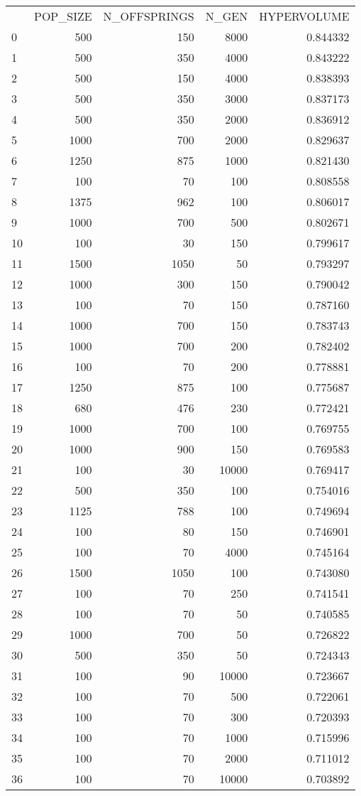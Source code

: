 \begin{tabular}{lrrrr}
 & POP_SIZE & N_OFFSPRINGS & N_GEN & HYPERVOLUME \\
0 & 500 & 150 & 8000 & 0.844332 \\
1 & 500 & 350 & 4000 & 0.843222 \\
2 & 500 & 150 & 4000 & 0.838393 \\
3 & 500 & 350 & 3000 & 0.837173 \\
4 & 500 & 350 & 2000 & 0.836912 \\
5 & 1000 & 700 & 2000 & 0.829637 \\
6 & 1250 & 875 & 1000 & 0.821430 \\
7 & 100 & 70 & 100 & 0.808558 \\
8 & 1375 & 962 & 100 & 0.806017 \\
9 & 1000 & 700 & 500 & 0.802671 \\
10 & 100 & 30 & 150 & 0.799617 \\
11 & 1500 & 1050 & 50 & 0.793297 \\
12 & 1000 & 300 & 150 & 0.790042 \\
13 & 100 & 70 & 150 & 0.787160 \\
14 & 1000 & 700 & 150 & 0.783743 \\
15 & 1000 & 700 & 200 & 0.782402 \\
16 & 100 & 70 & 200 & 0.778881 \\
17 & 1250 & 875 & 100 & 0.775687 \\
18 & 680 & 476 & 230 & 0.772421 \\
19 & 1000 & 700 & 100 & 0.769755 \\
20 & 1000 & 900 & 150 & 0.769583 \\
21 & 100 & 30 & 10000 & 0.769417 \\
22 & 500 & 350 & 100 & 0.754016 \\
23 & 1125 & 788 & 100 & 0.749694 \\
24 & 100 & 80 & 150 & 0.746901 \\
25 & 100 & 70 & 4000 & 0.745164 \\
26 & 1500 & 1050 & 100 & 0.743080 \\
27 & 100 & 70 & 250 & 0.741541 \\
28 & 100 & 70 & 50 & 0.740585 \\
29 & 1000 & 700 & 50 & 0.726822 \\
30 & 500 & 350 & 50 & 0.724343 \\
31 & 100 & 90 & 10000 & 0.723667 \\
32 & 100 & 70 & 500 & 0.722061 \\
33 & 100 & 70 & 300 & 0.720393 \\
34 & 100 & 70 & 1000 & 0.715996 \\
35 & 100 & 70 & 2000 & 0.711012 \\
36 & 100 & 70 & 10000 & 0.703892 \\
\end{tabular}
